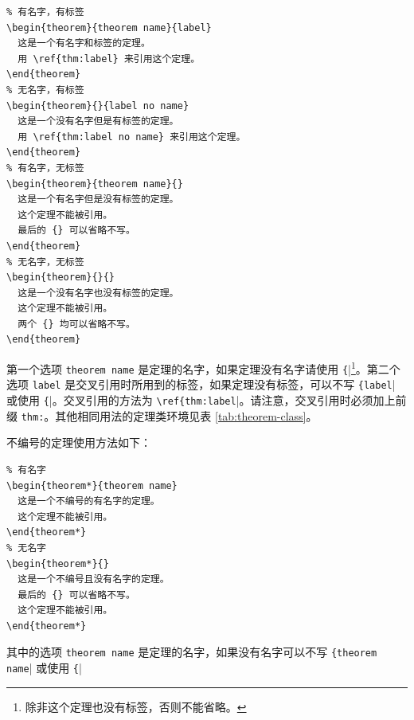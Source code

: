 \documentclass[lang=cn,10pt,scheme=chinese]{boyogalaelegantbook}
\begin{document}
\begin{lstlisting}
% 有名字，有标签
\begin{theorem}{theorem name}{label}
  这是一个有名字和标签的定理。
  用 \ref{thm:label} 来引用这个定理。
\end{theorem}
% 无名字，有标签
\begin{theorem}{}{label no name}
  这是一个没有名字但是有标签的定理。
  用 \ref{thm:label no name} 来引用这个定理。
\end{theorem}
% 有名字，无标签
\begin{theorem}{theorem name}{}
  这是一个有名字但是没有标签的定理。
  这个定理不能被引用。
  最后的 {} 可以省略不写。
\end{theorem}
% 无名字，无标签
\begin{theorem}{}{}
  这是一个没有名字也没有标签的定理。
  这个定理不能被引用。
  两个 {} 均可以省略不写。
\end{theorem}
\end{lstlisting}

第一个选项 \lstinline{theorem name} 是定理的名字，如果定理没有名字请使用 \lstinline|{||\cprotect\footnote{除非这个定理也没有标签，否则不能省略。}。第二个选项 \lstinline{label} 是交叉引用时所用到的标签，如果定理没有标签，可以不写 \lstinline|{label|| 或使用 \lstinline|{||。交叉引用的方法为 \lstinline|\ref{thm:label||。请注意，交叉引用时必须加上前缀 \lstinline{thm:}。其他相同用法的定理类环境见表 \ref{tab:theorem-class}。

不编号的定理使用方法如下：

\begin{lstlisting}
% 有名字
\begin{theorem*}{theorem name}
  这是一个不编号的有名字的定理。
  这个定理不能被引用。
\end{theorem*}
% 无名字
\begin{theorem*}{}
  这是一个不编号且没有名字的定理。
  最后的 {} 可以省略不写。
  这个定理不能被引用。
\end{theorem*}
\end{lstlisting}
其中的选项 \lstinline{theorem name} 是定理的名字，如果没有名字可以不写 \lstinline|{theorem name|| 或使用 \lstinline|{||
\end{document}
